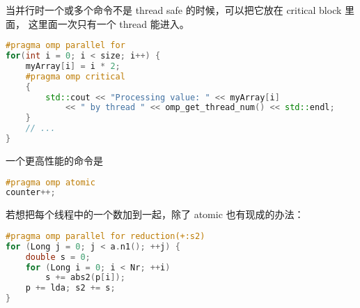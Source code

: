 当并行时一个或多个命令不是 thread safe 的时候，可以把它放在 critical block 里面， 这里面一次只有一个 thread 能进入。
\begin{lstlisting}[language=cpp]
#pragma omp parallel for
for(int i = 0; i < size; i++) {
	myArray[i] = i * 2;
	#pragma omp critical
	{
		std::cout << "Processing value: " << myArray[i]
			<< " by thread " << omp_get_thread_num() << std::endl;
	}
	// ...
}
\end{lstlisting}

一个更高性能的命令是
\begin{lstlisting}[language=cpp]
#pragma omp atomic
counter++;
\end{lstlisting}

若想把每个线程中的一个数加到一起，除了 atomic 也有现成的办法：
\begin{lstlisting}[language=cpp]
#pragma omp parallel for reduction(+:s2)
for (Long j = 0; j < a.n1(); ++j) {
	double s = 0;
	for (Long i = 0; i < Nr; ++i)
		s += abs2(p[i]);
	p += lda; s2 += s;
}
\end{lstlisting}
